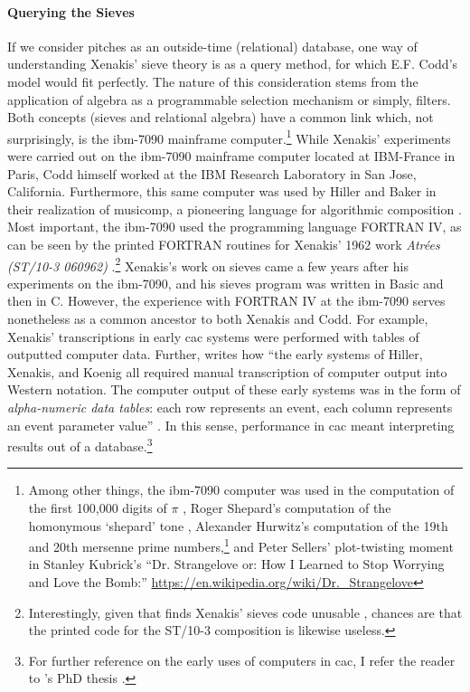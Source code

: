 \paragraph{Querying the Sieves}
If we consider pitches as an outside-time (relational) database, one way of understanding Xenakis' sieve theory is as a query method, for which E.F. Codd's  model would fit perfectly. The nature of this consideration stems from the application of algebra as a programmable selection mechanism or simply, filters. Both concepts (sieves and relational algebra) have a common link which, not surprisingly, is the \gls{ibm-7090} mainframe computer.\footnote{Among other things, the \gls{ibm-7090} computer was used in the computation of the first 100,000 digits of $\pi$ \parencite{picalc}, Roger Shepard's computation of the homonymous `shepard' tone \parencite{shepard}, Alexander Hurwitz's computation of the 19th and 20th mersenne prime numbers,\footnote{\url{https://www.mersenne.org/primes/}} and Peter Sellers' plot-twisting moment in Stanley Kubrick's ``Dr. Strangelove or: How I Learned to Stop Worrying and Love the Bomb:'' \url{https://en.wikipedia.org/wiki/Dr._Strangelove}} While Xenakis' experiments were carried out on the \gls{ibm-7090} mainframe computer located at IBM-France in Paris, Codd himself worked at the IBM Research Laboratory in San Jose, California. Furthermore, this same computer was used by Hiller and Baker in their realization of \gls{musicomp}, a pioneering language for algorithmic composition \parencite[44]{Ari05:Ano}. Most important, the \gls{ibm-7090} used the programming language FORTRAN IV, as can be seen by the printed FORTRAN routines for Xenakis' 1962 work \textit{Atrées (ST/10-3 060962)} \parencite[145]{Xen92:For}.\footnote{Interestingly, given that \citeauthor{arizaSieves} finds Xenakis' sieves code unusable \parencite[1]{arizaSieves}, chances are that the printed code for the ST/10-3 composition is likewise useless.} Xenakis's work on sieves came a few years after his experiments on the \gls{ibm-7090}, and his sieves program was written in Basic and then in C. However, the experience with FORTRAN IV at the \gls{ibm-7090} serves nonetheless as a common ancestor to both Xenakis and Codd. For example, Xenakis' transcriptions in early \gls{cac} systems were performed with tables of outputted computer data. Further, \citeauthor{Ari05:Ano} \parencite{Ari05:Ano} writes how ``the early systems of Hiller, Xenakis, and Koenig all required manual transcription of computer output into Western notation. The computer output of these early systems was in the form of \textit{alpha-numeric data tables}: each row represents an event, each column represents an event parameter value'' \im \parencite[94]{Ari05:Ano}. In this sense, performance in \gls{cac} meant interpreting results out of a database.\footnote{For further reference on the early uses of computers in \gls{cac}, I refer the reader to \citeauthor{Ari05:Ano}'s PhD thesis \parencite{Ari05:Ano}.}


